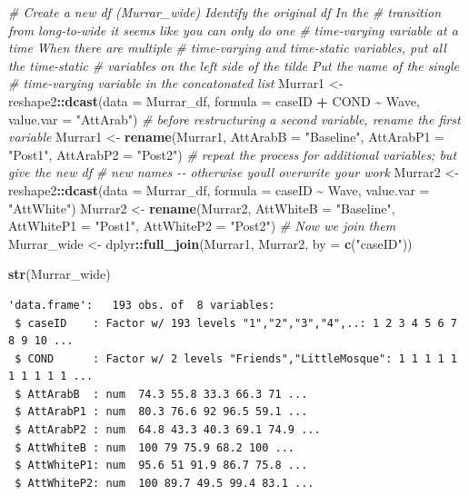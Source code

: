 \documentclass[
  11pt,
]{book}
\newenvironment{Shaded}{\begin{snugshade}}{\end{snugshade}}
\newcommand{\AttributeTok}[1]{\textcolor[rgb]{0.27,0.27,0.27}{#1}}
\newcommand{\CommentTok}[1]{\textcolor[rgb]{0.37,0.37,0.37}{\textit{#1}}}
\newcommand{\FunctionTok}[1]{\textcolor[rgb]{0.27,0.27,0.27}{\textbf{#1}}}
\newcommand{\NormalTok}[1]{#1}
\newcommand{\OtherTok}[1]{\textcolor[rgb]{0.37,0.37,0.37}{#1}}
\newcommand{\SpecialCharTok}[1]{\textcolor[rgb]{0.43,0.43,0.43}{\textbf{#1}}}
\newcommand{\StringTok}[1]{\textcolor[rgb]{0.5,0.5,0.5}{#1}}
\begin{document}
\begin{Shaded}
\begin{Highlighting}[]
\CommentTok{\# Create a new df (Murrar\_wide) Identify the original df In the}
\CommentTok{\# transition from long{-}to{-}wide it seems like you can only do one}
\CommentTok{\# time{-}varying variable at a time When there are multiple}
\CommentTok{\# time{-}varying and time{-}static variables, put all the time{-}static}
\CommentTok{\# variables on the left side of the tilde Put the name of the single}
\CommentTok{\# time{-}varying variable in the concatonated list}
\NormalTok{Murrar1 }\OtherTok{\textless{}{-}}\NormalTok{ reshape2}\SpecialCharTok{::}\FunctionTok{dcast}\NormalTok{(}\AttributeTok{data =}\NormalTok{ Murrar\_df, }\AttributeTok{formula =}\NormalTok{ caseID }\SpecialCharTok{+}\NormalTok{ COND }\SpecialCharTok{\textasciitilde{}}
\NormalTok{    Wave, }\AttributeTok{value.var =} \StringTok{"AttArab"}\NormalTok{)}
\CommentTok{\# before restructuring a second variable, rename the first variable}
\NormalTok{Murrar1 }\OtherTok{\textless{}{-}} \FunctionTok{rename}\NormalTok{(Murrar1, }\AttributeTok{AttArabB =} \StringTok{"Baseline"}\NormalTok{, }\AttributeTok{AttArabP1 =} \StringTok{"Post1"}\NormalTok{,}
    \AttributeTok{AttArabP2 =} \StringTok{"Post2"}\NormalTok{)}
\CommentTok{\# repeat the process for additional variables; but give the new df}
\CommentTok{\# new names {-}{-} otherwise you\textquotesingle{}ll overwrite your work}
\NormalTok{Murrar2 }\OtherTok{\textless{}{-}}\NormalTok{ reshape2}\SpecialCharTok{::}\FunctionTok{dcast}\NormalTok{(}\AttributeTok{data =}\NormalTok{ Murrar\_df, }\AttributeTok{formula =}\NormalTok{ caseID }\SpecialCharTok{\textasciitilde{}}\NormalTok{ Wave, }\AttributeTok{value.var =} \StringTok{"AttWhite"}\NormalTok{)}
\NormalTok{Murrar2 }\OtherTok{\textless{}{-}} \FunctionTok{rename}\NormalTok{(Murrar2, }\AttributeTok{AttWhiteB =} \StringTok{"Baseline"}\NormalTok{, }\AttributeTok{AttWhiteP1 =} \StringTok{"Post1"}\NormalTok{,}
    \AttributeTok{AttWhiteP2 =} \StringTok{"Post2"}\NormalTok{)}
\CommentTok{\# Now we join them}
\NormalTok{Murrar\_wide }\OtherTok{\textless{}{-}}\NormalTok{ dplyr}\SpecialCharTok{::}\FunctionTok{full\_join}\NormalTok{(Murrar1, Murrar2, }\AttributeTok{by =} \FunctionTok{c}\NormalTok{(}\StringTok{"caseID"}\NormalTok{))}

\FunctionTok{str}\NormalTok{(Murrar\_wide)}
\end{Highlighting}
\end{Shaded}

\begin{verbatim}
'data.frame':   193 obs. of  8 variables:
 $ caseID    : Factor w/ 193 levels "1","2","3","4",..: 1 2 3 4 5 6 7 8 9 10 ...
 $ COND      : Factor w/ 2 levels "Friends","LittleMosque": 1 1 1 1 1 1 1 1 1 1 ...
 $ AttArabB  : num  74.3 55.8 33.3 66.3 71 ...
 $ AttArabP1 : num  80.3 76.6 92 96.5 59.1 ...
 $ AttArabP2 : num  64.8 43.3 40.3 69.1 74.9 ...
 $ AttWhiteB : num  100 79 75.9 68.2 100 ...
 $ AttWhiteP1: num  95.6 51 91.9 86.7 75.8 ...
 $ AttWhiteP2: num  100 89.7 49.5 99.4 83.1 ...
\end{verbatim}
\end{document}
